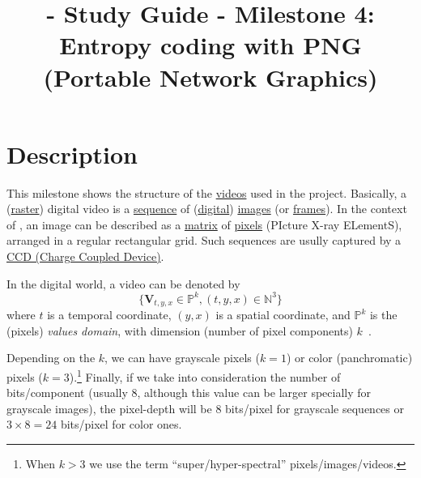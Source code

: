 
\title{\SM{} - Study Guide - Milestone 4: Entropy coding with PNG (Portable Network Graphics)}

\maketitle

\tableofcontents

\section{Description}

This milestone shows the structure of the
\href{https://en.wikipedia.org/wiki/Video}{videos} used in the
\theproject{} project. Basically, a
(\href{https://en.wikipedia.org/wiki/Raster_graphics}{raster}) digital video is
a \href{https://en.wikipedia.org/wiki/Sequence}{sequence} of
(\href{https://en.wikipedia.org/wiki/Digital_data}{digital})
\href{https://en.wikipedia.org/wiki/Image}{images} (or
\href{https://en.wikipedia.org/wiki/Film_frame}{frames}). In the
context of \theproject{}, an image can be described as a
\href{https://en.wikipedia.org/wiki/Matrix_(mathematics)}{matrix} of
\href{https://en.wikipedia.org/wiki/Pixel}{pixels} (PIcture X-ray
ELementS), arranged in a regular rectangular grid. Such sequences are
usully captured by a
\href{https://en.wikipedia.org/wiki/Charge-coupled_device}{CCD (Charge
  Coupled Device)}.

In the digital world, a video can be denoted by
\begin{equation*}
  \{{\mathbf V}_{t,y,x}\in\mathbb{P}^{k}, (t,y,x)\in\mathbb{N}^3\}
\end{equation*}
where $t$ is a temporal coordinate, $(y,x)$ is a spatial coordinate,
and $\mathbb{P}^{k}$ is the (pixels) \emph{values domain}, with
dimension (number of pixel components) $k$~\cite{burger2016digital}.


Depending on the $k$, we can have grayscale pixels ($k=1$) or
color (panchromatic) pixels ($k=3$).\footnote{When $k>3$ we use the
term ``super/hyper-spectral'' pixels/images/videos.} Finally, if we
take into consideration the number of bits/component (usually 8,
although this value can be larger specially for grayscale images), the
pixel-depth will be $8$ bits/pixel for grayscale sequences or $3\times
8=24$ bits/pixel for color ones.

